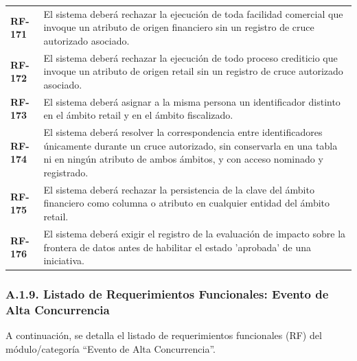 \documentclass[11pt]{article}
\begin{document}
\begin{longtable}[]{@{}
  >{\raggedright\arraybackslash}p{}
  >{\raggedright\arraybackslash}p{}@{}}
\textbf{RF-171} & El sistema deberá rechazar la ejecución de toda facilidad comercial que invoque un atributo de origen financiero sin un registro de cruce autorizado asociado. \\
\addlinespace[2pt]
\textbf{RF-172} & El sistema deberá rechazar la ejecución de todo proceso crediticio que invoque un atributo de origen retail sin un registro de cruce autorizado asociado. \\
\addlinespace[2pt]
\textbf{RF-173} & El sistema deberá asignar a la misma persona un identificador distinto en el ámbito retail y en el ámbito fiscalizado. \\
\addlinespace[2pt]
\textbf{RF-174} & El sistema deberá resolver la correspondencia entre identificadores únicamente durante un cruce autorizado, sin conservarla en una tabla ni en ningún atributo de ambos ámbitos, y con acceso nominado y registrado. \\
\addlinespace[2pt]
\textbf{RF-175} & El sistema deberá rechazar la persistencia de la clave del ámbito financiero como columna o atributo en cualquier entidad del ámbito retail. \\
\addlinespace[2pt]
\textbf{RF-176} & El sistema deberá exigir el registro de la evaluación de impacto sobre la frontera de datos antes de habilitar el estado 'aprobada' de una iniciativa. \\
\end{longtable}

\subsubsection{A.1.9. Listado de Requerimientos Funcionales: Evento de Alta Concurrencia}\label{a-1-9-listado-de-requerimientos-funcionales-evento-de-alta-concurrencia}

A continuación, se detalla el listado de requerimientos funcionales (RF) del módulo/categoría ``Evento de Alta Concurrencia''.
\end{document}
